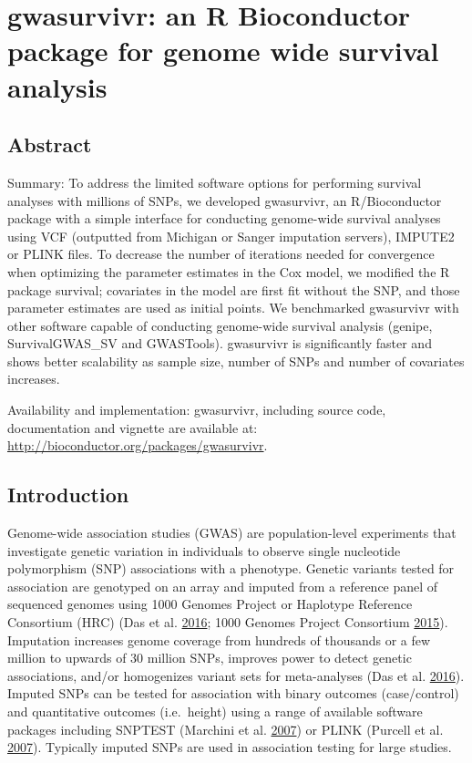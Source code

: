 \documentclass[]{DissertateOSU}
\begin{document}
\FloatBarrier

\newpage

\pagestyle{plain} \fancyhead[L]{} \fancyhead[R]{}
\fancyfoot[C]{\thepage}
\chapter{gwasurvivr: an R Bioconductor package for genome wide survival analysis}
\doublespacing

\section{Abstract}\label{abstract-1}

Summary: To address the limited software options for performing survival
analyses with millions of SNPs, we developed gwasurvivr, an
R/Bioconductor package with a simple interface for conducting
genome-wide survival analyses using VCF (outputted from Michigan or
Sanger imputation servers), IMPUTE2 or PLINK files. To decrease the
number of iterations needed for convergence when optimizing the
parameter estimates in the Cox model, we modified the R package
survival; covariates in the model are first fit without the SNP, and
those parameter estimates are used as initial points. We benchmarked
gwasurvivr with other software capable of conducting genome-wide
survival analysis (genipe, SurvivalGWAS\_SV and GWASTools). gwasurvivr
is significantly faster and shows better scalability as sample size,
number of SNPs and number of covariates increases.

Availability and implementation: gwasurvivr, including source code,
documentation and vignette are available at:
\url{http://bioconductor.org/packages/gwasurvivr}.

\section{Introduction}\label{introduction-2}

Genome-wide association studies (GWAS) are population-level experiments
that investigate genetic variation in individuals to observe single
nucleotide polymorphism (SNP) associations with a phenotype. Genetic
variants tested for association are genotyped on an array and imputed
from a reference panel of sequenced genomes using 1000 Genomes Project
or Haplotype Reference Consortium (HRC) (Das et al.
\protect\hyperlink{ref-michigan_imputation}{2016}; 1000 Genomes Project
Consortium \protect\hyperlink{ref-1000genomes}{2015}). Imputation
increases genome coverage from hundreds of thousands or a few million to
upwards of 30 million SNPs, improves power to detect genetic
associations, and/or homogenizes variant sets for meta-analyses (Das et
al. \protect\hyperlink{ref-michigan_imputation}{2016}). Imputed SNPs can
be tested for association with binary outcomes (case/control) and
quantitative outcomes (i.e.~height) using a range of available software
packages including SNPTEST (Marchini et al.
\protect\hyperlink{ref-snptest}{2007}) or PLINK (Purcell et al.
\protect\hyperlink{ref-plink}{2007}). Typically imputed SNPs are used in
association testing for large studies.
\end{document}
